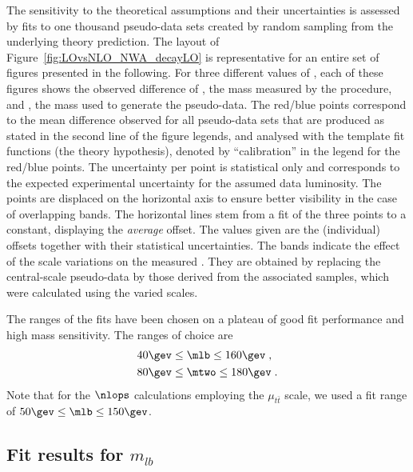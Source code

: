  The sensitivity to the theoretical assumptions and their uncertainties is
 assessed by fits to one thousand pseudo-data sets created by random sampling from
 the underlying theory prediction.
%
 The layout of Figure~\ref{fig:LOvsNLO_NWA_decayLO} is representative for an
 entire set of figures presented in the following. For three different values
 of \mtin, each of these figures shows the observed difference of
 \mtou, the mass measured by the procedure, and \mtin, the mass used
 to generate the pseudo-data.
%
 The red/blue points correspond to the mean difference observed for all pseudo-data
 sets that are produced  as stated in the second line of the figure
 legends,  and analysed with the template fit functions (the theory
 hypothesis), denoted by ``calibration''  in the legend for
 the red/blue points.
 The uncertainty per point is statistical only and corresponds to
 the expected experimental uncertainty for the assumed data luminosity.
 The points are displaced on the horizontal axis to ensure better
 visibility in the case of overlapping bands.
The horizontal lines stem from a fit of the three points to a
 constant, displaying the {\em average} offset.
  The values given are the (individual) offsets together with their
 statistical uncertainties.
%
 The bands indicate the effect of the scale variations on the measured \mt.
 They are obtained by replacing the central-scale pseudo-data by those
 derived from
 the associated samples, which were calculated using the varied scales.

 The ranges of the fits have been chosen on a plateau of good fit performance and high mass sensitivity.
%
The ranges of choice are
\begin{align}
&40\gev\leq \mlb\leq 160\gev\;,\label{eq:fitranges}\\
&80\gev\leq \mtwo\leq 180\gev\;.\nonumber
\end{align}
Note that for the $\nlops$ calculations employing the $\mu_{t\bar t}$
scale, we used a fit range of $50\gev\leq \mlb\leq 150\gev$.


\boldmath
\subsection{Fit results for $m_{lb}$}
\unboldmath

